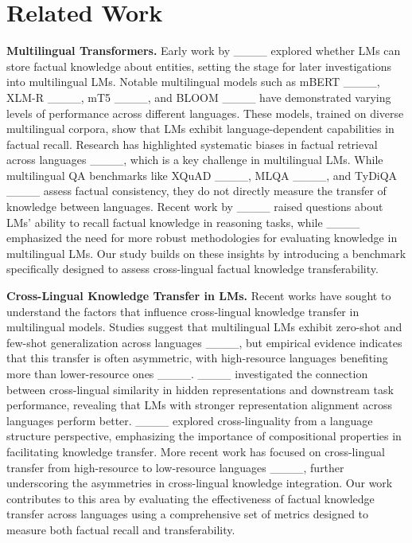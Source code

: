 \section{Related Work}
\textbf{Multilingual Transformers.} Early work by ____ explored whether LMs can store factual knowledge about entities, setting the stage for later investigations into multilingual LMs. Notable multilingual models such as mBERT ____, XLM-R ____, mT5 ____, and BLOOM ____ have demonstrated varying levels of performance across different languages. These models, trained on diverse multilingual corpora, show that LMs exhibit language-dependent capabilities in factual recall. Research has highlighted systematic biases in factual retrieval across languages ____, which is a key challenge in multilingual LMs. While multilingual QA benchmarks like XQuAD ____, MLQA ____, and TyDiQA ____ assess factual consistency, they do not directly measure the transfer of knowledge between languages. Recent work by ____ raised questions about LMs' ability to recall factual knowledge in reasoning tasks, while ____ emphasized the need for more robust methodologies for evaluating knowledge in multilingual LMs. Our study builds on these insights by introducing a benchmark specifically designed to assess cross-lingual factual knowledge transferability.

\textbf{Cross-Lingual Knowledge Transfer in LMs.} Recent works have sought to understand the factors that influence cross-lingual knowledge transfer in multilingual models. Studies suggest that multilingual LMs exhibit zero-shot and few-shot generalization across languages ____, but empirical evidence indicates that this transfer is often asymmetric, with high-resource languages benefiting more than lower-resource ones ____. ____ investigated the connection between cross-lingual similarity in hidden representations and downstream task performance, revealing that LMs with stronger representation alignment across languages perform better. ____ explored cross-linguality from a language structure perspective, emphasizing the importance of compositional properties in facilitating knowledge transfer. More recent work has focused on cross-lingual transfer from high-resource to low-resource languages ____, further underscoring the asymmetries in cross-lingual knowledge integration. Our work contributes to this area by evaluating the effectiveness of factual knowledge transfer across languages using a comprehensive set of metrics designed to measure both factual recall and transferability.

